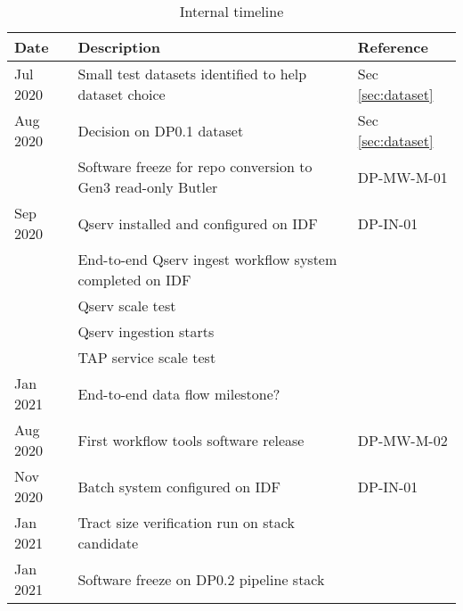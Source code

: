 \tiny \begin{longtable} {|l|l|l|} \caption{Internal timeline   \label{tab:timeline}}\\
\hline
\textbf{Date}&\textbf{Description}&\textbf{Reference}  \\ \hline

{Jul 2020}&{Small test datasets identified to help dataset choice}&{Sec \ref{sec:dataset}} \\ \hline
{Aug 2020}&{Decision on DP0.1 dataset}&{Sec \ref{sec:dataset}} \\ \hline
{}&{Software freeze for repo conversion to Gen3 read-only Butler}&{DP-MW-M-01} \\ \hline
{Sep 2020}&{Qserv installed and configured on IDF}&{DP-IN-01} \\ \hline
{}&{End-to-end Qserv ingest workflow system completed on IDF}&{} \\ \hline
{}&{Qserv scale test}&{} \\ \hline
{}&{Qserv ingestion starts}&{} \\ \hline
{}&{TAP service scale test}&{} \\ \hline
{Jan 2021}&{End-to-end data flow milestone?}&{} \\ \hline
{Aug 2020}&{First workflow tools software release}&{DP-MW-M-02} \\ \hline
{Nov 2020}&{Batch system configured on IDF}&{DP-IN-01} \\ \hline
{Jan 2021}&{Tract size verification run on stack candidate}&{} \\ \hline
{Jan 2021}&{Software freeze on DP0.2 pipeline stack}&{} \\ \hline
\end{longtable} \normalsize
